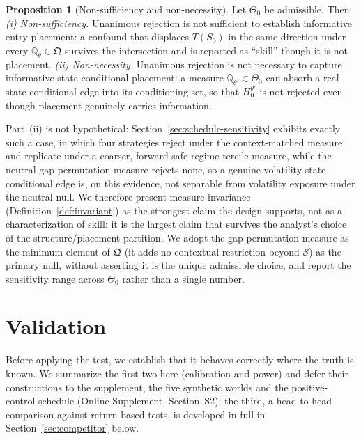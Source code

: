 \documentclass[preprint,12pt]{elsarticle}
\theoremstyle{definition}
\newtheorem{proposition}[theorem]{Proposition}
\begin{document}
\begin{proposition}[Non-sufficiency and non-necessity]
\label{prop:nonsuff}
Let $\Theta_0$ be admissible. Then:
\emph{(i) Non-sufficiency.} Unanimous rejection is not sufficient to establish
informative entry placement: a confound that displaces $T(S_0)$ in the same
direction under every $\mathbb{Q}_\theta\in\mathfrak Q$ survives the intersection
and is reported as ``skill'' though it is not placement.
\emph{(ii) Non-necessity.} Unanimous rejection is not necessary to capture
informative state-conditional placement: a measure $\mathbb{Q}_{\theta'}\in\Theta_0$
can absorb a real state-conditional edge into its conditioning set, so that
$H_0^{\theta'}$ is not rejected even though placement genuinely carries information.
\end{proposition}

Part~(ii) is not hypothetical: Section~\ref{sec:schedule-sensitivity} exhibits
exactly such a case, in which four strategies reject under the context-matched
measure and replicate under a coarser, forward-safe regime-tercile measure, while the
neutral gap-permutation measure rejects none, so a genuine volatility-state-conditional
edge is, on this evidence, not separable from volatility exposure under the neutral null. We therefore present measure invariance
(Definition~\ref{def:invariant}) as the strongest claim the design supports, not
as a characterization of skill: it is the largest claim that survives the
analyst's choice of the structure/placement partition. We adopt the
gap-permutation measure as the minimum element of $\mathfrak Q$ (it adds no
contextual restriction beyond $\mathcal S$) as the primary null, without
asserting it is the unique admissible choice, and report the sensitivity range
across $\Theta_0$ rather than a single number.

\section{Validation}
\label{sec:simulation-validation}

Before applying the test, we establish that it behaves correctly where the truth is known. We summarize the first two here (calibration and power) and defer their constructions to the supplement, the five synthetic worlds and the positive-control schedule (Online Supplement, Section~S2); the third, a head-to-head comparison against return-based tests, is developed in full in Section~\ref{sec:competitor} below.
\end{document}
